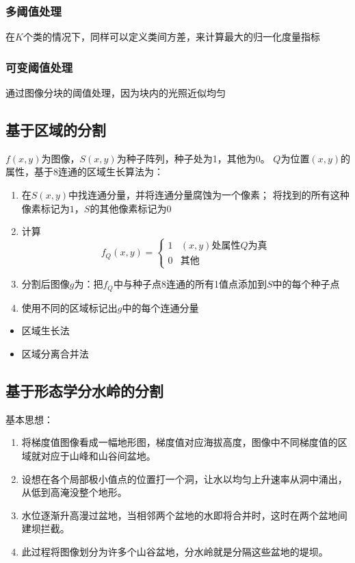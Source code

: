 \subsubsection{多阈值处理}
在$K$个类的情况下，同样可以定义类间方差，来计算最大的归一化度量指标

\subsubsection{可变阈值处理}
通过图像分块的阈值处理，因为块内的光照近似均匀


\subsection{基于区域的分割}
$f(x,y)$为图像，$S(x,y)$为种子阵列，种子处为1，其他为0。
$Q$为位置$(x,y)$的属性，基于8连通的区域生长算法为：
\begin{enumerate}
	\item 在$S(x,y)$中找连通分量，并将连通分量腐蚀为一个像素；
	将找到的所有这种像素标记为$1$，$S$的其他像素标记为$0$
	\item 计算
	\[f_Q(x,y)=\begin{cases}
	1 & \text{$(x,y)$处属性$Q$为真}\\
	0 & \text{其他}
	\end{cases}\]
	\item 分割后图像$g$为：把$f_Q$中与种子点8连通的所有1值点添加到$S$中的每个种子点
	\item 使用不同的区域标记出$g$中的每个连通分量
\end{enumerate}

\begin{itemize}
	\item 区域生长法
	\item 区域分离合并法
\end{itemize}


\subsection{基于形态学分水岭的分割}
基本思想：
\begin{enumerate}
	\item 将梯度值图像看成一幅地形图，梯度值对应海拔高度，图像中不同梯度值的区域就对应于山峰和山谷间盆地。
	\item 设想在各个局部极小值点的位置打一个洞，让水以均匀上升速率从洞中涌出，从低到高淹没整个地形。
	\item 水位逐渐升高漫过盆地，当相邻两个盆地的水即将合并时，这时在两个盆地间建坝拦截。
	\item 此过程将图像划分为许多个山谷盆地，分水岭就是分隔这些盆地的堤坝。
\end{enumerate}

